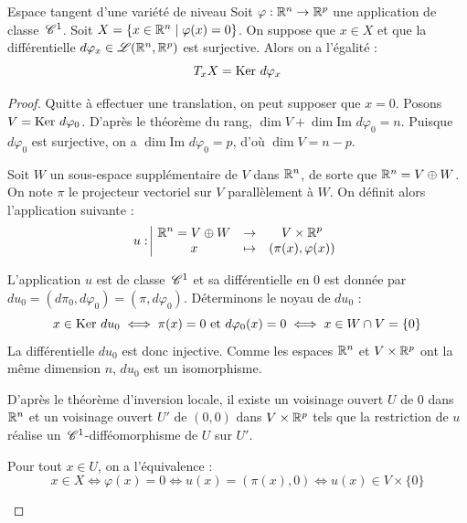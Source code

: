 \begin{theoreme}{Espace tangent d'une variété de niveau}{}
    Soit $\varphi : \mathbb{R}^n \to \mathbb{R}^p$ une application de classe $\,\mathscr C^{1}$.
    Soit $X = \{x \in \mathbb{R}^n \mid \varphi(x) = 0\}$.
    On suppose que $x \in X$ et que la différentielle $d\varphi_x \in \mathscr{L}(\mathbb{R}^n, \mathbb{R}^p)$ est surjective.
    Alors on a l'égalité :
    \[ T_x X = \operatorname{Ker} \, d\varphi_x \]
\end{theoreme}

\begin{proof}
    Quitte à effectuer une translation, on peut supposer que $x = 0$.
    Posons $V = \operatorname{Ker} \, d\varphi_0$. D'après le théorème du rang, $\dim V + \dim \text{Im } d\varphi_0 = n$. Puisque $d\varphi_0$ est surjective, on a $\dim \text{Im } d\varphi_0 = p$, d'où $\dim V = n - p$.

    Soit $W$ un sous-espace supplémentaire de $V$ dans $\mathbb{R}^n$, de sorte que $\mathbb{R}^n = V \oplus W$.
    On note $\pi$ le projecteur vectoriel sur $V$ parallèlement à $W$.
    On définit alors l'application suivante :
    \[ u: \space \begin{array}{|ccc} \displaystyle \mathbb{R}^n = V \oplus W & \to & \displaystyle V \times \mathbb{R}^p \\ \displaystyle x & \mapsto & \displaystyle (\pi(x), \varphi(x)) \end{array} \]

    L'application $u$ est de classe $\,\mathscr C^{1}$ et sa différentielle en $0$ est donnée par $du_0 = (d\pi_0, d\varphi_0) = (\pi, d\varphi_0)$.
    Déterminons le noyau de $du_0$ :
    \[ x \in \operatorname{Ker} \, du_0 \iff \pi(x) = 0 \text{ et } d\varphi_0(x) = 0 \iff x \in W \cap V = \{0\} \]
    La différentielle $du_0$ est donc injective. Comme les espaces $\mathbb{R}^n$ et $V \times \mathbb{R}^p$ ont la même dimension $n$, $du_0$ est un isomorphisme.

    D'après le théorème d'inversion locale, il existe un voisinage ouvert $U$ de $0$ dans $\mathbb{R}^n$ et un voisinage ouvert $U'$ de $(0,0)$ dans $V \times \mathbb{R}^p$ tels que la restriction de $u$ réalise un $\,\mathscr C^{1}$-difféomorphisme de $U$ sur $U'$.

    Pour tout $x \in U$, on a l'équivalence :
    \[ x \in X \iff \varphi(x) = 0 \iff u(x) = (\pi(x), 0) \iff u(x) \in V \times \{0\} \]

    \begin{center}
\end{center}
\end{proof}
